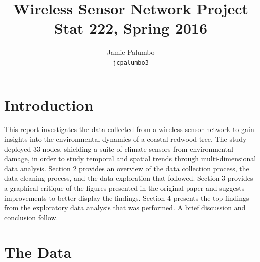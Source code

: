 \documentclass[11pt]{article}
\title{Wireless Sensor Network Project\\
  Stat 222, Spring 2016}
\author{
  Jamie Palumbo\\
  \texttt{jcpalumbo3}
}
\begin{document}
\maketitle



\section{Introduction}

This report investigates the data collected from a wireless sensor network to gain insights into the environmental dynamics of a coastal redwood tree. The study deployed 33 nodes, shielding a suite of climate sensors from environmental damage, in order to study temporal and spatial trends through multi-dimensional data analysis. Section 2 provides an overview of the data collection process, the data cleaning process, and the data exploration that followed. Section 3 provides a graphical critique of the figures presented in the original paper and suggests improvements to better display the findings. Section 4 presents the top findings from the exploratory data analysis that was performed. A brief discussion and conclusion follow. 

\section{The Data}
\end{document}
